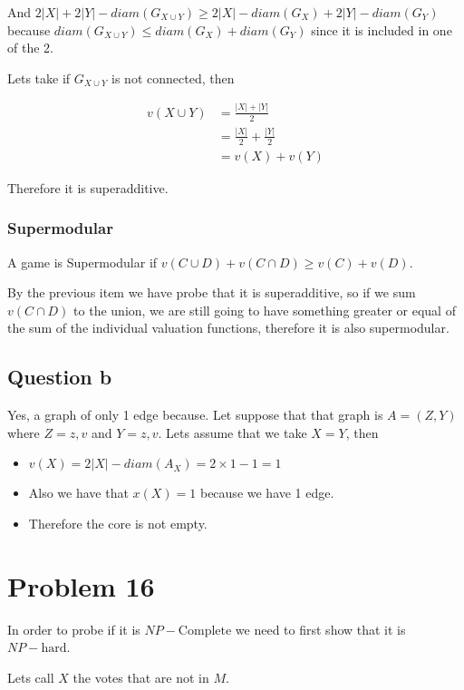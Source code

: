 \documentclass[12pt, a4paper]{article}
\begin{document}
And $2|X| + 2|Y| - diam(G_{X \cup Y}) \geq 2|X| - diam(G_X) + 2|Y| - diam(G_Y)$ because $diam(G_{X \cup Y}) \leq diam(G_X) + diam(G_Y)$ since it is included in one of the 2.

Lets take if $G_{X \cup Y}$ is not connected, then 

\begin{subequations}
  \begin{align}
    v(X \cup Y) &= \frac{|X| + |Y|}{2}\\
                &= \frac{|X|}{2} + \frac{|Y|}{2}\\
                &= v(X) + v(Y)
  \end{align}
\end{subequations}

Therefore it is superadditive.

\subsubsection{Supermodular}
A game is Supermodular if $v(C \cup D) + v(C \cap D) \geq v(C) + v(D)$.

By the previous item we have probe that it is superadditive, so if we sum $v(C \cap D)$ to the union, we are still going to have something
greater or equal of the sum of the individual valuation functions, therefore it is also supermodular.

\subsection{Question b}
Yes, a graph of only 1 edge because. Let suppose that that graph is $A = (Z, Y)$ where $Z={z,v}$ and $Y = {z,v}$. 
Lets assume that we take $X = Y$, then

\begin{itemize}
  \item $v(X) = 2 |X| - diam(A_X) = 2 \times 1 - 1 = 1$ 
  \item Also we have that $x(X) = 1$ because we have 1 edge.
  \item Therefore the core is not empty.
\end{itemize}

\section{Problem 16}
In order to probe if it is $NP-\text{Complete}$ we need to first show that it is $NP-\text{hard}$.

Lets call $X$ the votes that are not in $M$.
\end{document}
